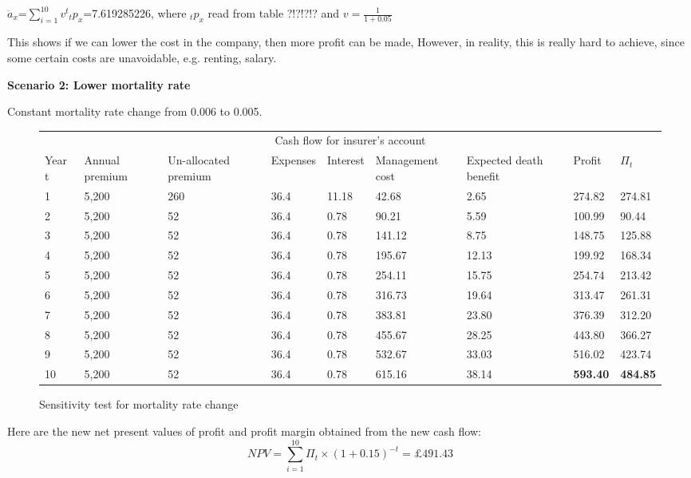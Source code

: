 \documentclass{report}
\begin{document}
$\ddot{a}_x$=$\sum_{i=1}^{10} v^t {_tp_x}$=7.619285226, where $_tp_x$ read from table ?!?!?!? and $v=\frac{1}{1+0.05}$ 

This shows if we can lower the cost in the company, then more profit can be made, However, in reality, this is really hard to achieve, since some certain costs are unavoidable, e.g. renting, salary.




\textbf{Scenario 2: Lower mortality rate} 

Constant mortality rate change from 0.006 to 0.005.



\begin{figure}[H]
\hfill
    \centering
\begin{tabular}{p{0.8cm} p{1.5cm} p{1.5cm} p{1.2cm} p{1cm} p{2cm}p{1.5cm} p{1.5cm} p{1.5cm} }
\toprule
\multicolumn{9}{c}{Cash flow for insurer's account} \\
\cmidrule(r){3-7}

Year t & Annual premium & Un-allocated premium & Expenses & Interest &Management cost& Expected death benefit & Profit& $\Pi_t$  \\
\midrule

1&5,200&260&36.4&11.18&42.68&2.65&274.82&274.81\\
2&5,200&52&36.4&0.78&90.21&5.59&100.99&90.44\\
3&5,200&52&36.4&0.78&141.12&8.75&148.75&125.88\\
4&5,200&52&36.4&0.78&195.67&12.13&199.92&168.34\\
5&5,200&52&36.4&0.78&254.11&15.75&254.74&213.42\\
6&5,200&52&36.4&0.78&316.73&19.64&313.47&261.31\\
7&5,200&52&36.4&0.78&383.81&23.80&376.39&312.20\\
8&5,200&52&36.4&0.78&455.67&28.25&443.80&366.27\\
9&5,200&52&36.4&0.78&532.67&33.03&516.02&423.74\\
10&5,200&52&36.4&0.78&615.16&38.14&\textbf{593.40}&\textbf{484.85}\\

\bottomrule
\end{tabular}
\caption{Sensitivity test for mortality rate change}
\label{determ-sensi-morta}
\end{figure}

Here are the new net present values of profit and profit margin obtained from the new cash flow:
\[
 NPV=\sum_{i=1}^{10} \Pi_t \times (1+0.15)^{-t} = \pounds 491.43
\]
 
\end{document}

